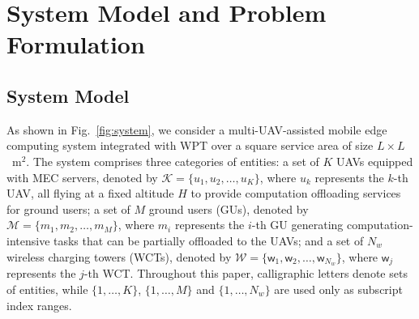 \documentclass[journal]{IEEEtran}
\begin{document}

\section{System Model and Problem Formulation}\label{sec:model}
\subsection{System Model}
As shown in Fig.~\ref{fig:system}, we consider a multi-UAV-assisted mobile edge computing
system integrated with WPT over a square service area of size $L\times L$~m$^2$.
The system comprises three categories of entities: a set of $K$ UAVs equipped
with MEC servers, denoted by $\mathcal{K}=\{u_1,u_2,\ldots,u_K\}$, where $u_k$
represents the $k$-th UAV, all flying at a fixed altitude $H$ to provide
computation offloading services for ground users; a set of $M$ ground users
(GUs), denoted by $\mathcal{M}=\{m_1,m_2,\ldots,m_M\}$, where $m_i$ represents
the $i$-th GU generating computation-intensive tasks that can be partially
offloaded to the UAVs; and a set of $N_w$ wireless charging towers (WCTs),
denoted by $\mathcal{W}=\{\mathsf{w}_1,\mathsf{w}_2,\ldots,\mathsf{w}_{N_w}\}$, where
$\mathsf{w}_j$ represents the $j$-th WCT. Throughout this paper, calligraphic
letters denote sets of entities, while $\{1,\ldots,K\}$, $\{1,\ldots,M\}$ and
$\{1,\ldots,N_w\}$ are used only as subscript index ranges.
\end{document}
